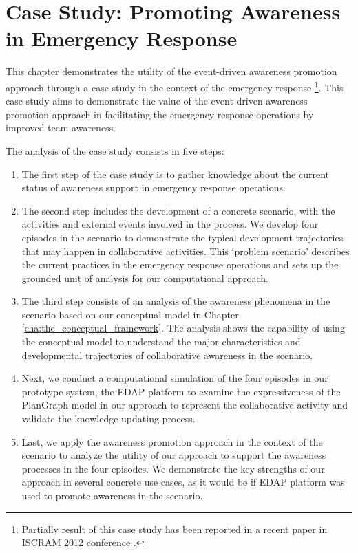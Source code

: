 \graphicspath{{Figures/}}

\chapter{Case Study: Promoting Awareness in Emergency Response} %
\label{cha:case_studies}
This chapter demonstrates the utility of the event-driven awareness promotion approach through a case study in the context of the emergency response \footnote{Partially result of this case study has been reported in a recent paper in ISCRAM 2012 conference \cite{Yu2012}.}. This case study aims to demonstrate the value of the event-driven awareness promotion approach in facilitating the emergency response operations by improved team awareness. 

The analysis of the case study consists in five steps:

\begin{enumerate}
	\item The first step of the case study is to gather knowledge about the current status of awareness support in emergency response operations.
	\item The second step includes the development of a concrete scenario, with the activities and external events involved in the process. We develop four episodes in the scenario to demonstrate the typical development trajectories that may happen in collaborative activities. This `problem scenario' \cite{rosson2001usability} describes the current practices in the emergency response operations and sets up the grounded unit of analysis for our computational approach.
	\item The third step consists of an analysis of the awareness phenomena in the scenario based on our conceptual model in Chapter \ref{cha:the_conceptual_framework}. The analysis shows the capability of using the conceptual model to understand the major characteristics and developmental trajectories of collaborative awareness in the scenario.
	\item Next, we conduct a computational simulation of the four episodes in our prototype system, the EDAP platform to examine the expressiveness of the PlanGraph model in our approach to represent the collaborative activity and validate the knowledge updating process.
	\item Last, we apply the awareness promotion approach in the context of the scenario to analyze the utility of our approach to support the awareness processes in the four episodes. We demonstrate the key strengths of our approach in several concrete use cases, as it would be if EDAP platform was used to promote awareness in the scenario.
\end{enumerate}

